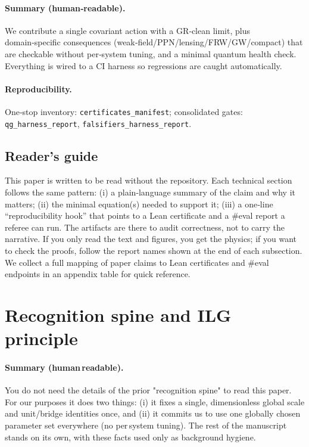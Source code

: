 \documentclass[aps,prd,twocolumn,superscriptaddress,nofootinbib,floatfix,longbibliography]{revtex4-2}
\begin{document}
\paragraph*{Summary (human‑readable).}
We contribute a single covariant action with a GR‑clean limit, plus domain‑specific consequences (weak‑field/PPN/lensing/FRW/GW/compact) that are checkable without per‑system tuning, and a minimal quantum health check. Everything is wired to a CI harness so regressions are caught automatically.
\paragraph*{Reproducibility.}
One‑stop inventory: \texttt{certificates\_manifest}; consolidated gates: \texttt{qg\_harness\_report}, \texttt{falsifiers\_harness\_report}. 
%
\subsection{Reader’s guide}\label{sec:readers-guide}
This paper is written to be read without the repository. Each technical section follows the same pattern: (i) a plain‑language summary of the claim and why it matters; (ii) the minimal equation(s) needed to support it; (iii) a one‑line “reproducibility hook” that points to a Lean certificate and a \#eval report a referee can run. The artifacts are there to audit correctness, not to carry the narrative. If you only read the text and figures, you get the physics; if you want to check the proofs, follow the report names shown at the end of each subsection. We collect a full mapping of paper claims to Lean certificates and \#eval endpoints in an appendix table for quick reference. \cite{lean4,mathlib4}
%
\section{Recognition spine and ILG principle}\label{sec:context}
%
\paragraph*{Summary (human\mbox{\,}readable).}
You do not need the details of the prior "recognition spine" to read this paper. For our purposes it does two things: (i) it fixes a single, dimensionless global scale and unit/bridge identities once, and (ii) it commits us to use one globally chosen parameter set everywhere (no per\mbox{\,}system tuning). The rest of the manuscript stands on its own, with these facts used only as background hygiene.
\end{document}

